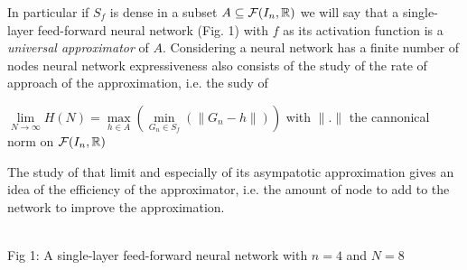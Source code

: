 \documentclass[12pt]{article}
\def\layersep{2.5cm}
\begin{document}
In particular if $S_f$ is dense in a subset $A \subseteq \mathcal{F}(I_n, \mathbb{R})$ we will say that a single-layer feed-forward neural network (Fig. 1) with $f$ as its activation function is a \textit{universal approximator} of $A$. Considering a neural network has a finite number of nodes neural network expressiveness also consists of the study of the rate of approach of the approximation, i.e. the sudy of \\

\begin{center}
  $\lim\limits_{N \to \infty} H(N) = \max\limits_{h\in A} (\min\limits_{G_n \in S_f} (\parallel G_n - h \parallel))$ with $\parallel . \parallel$ the cannonical norm on $\mathcal{F}(I_n, \mathbb{R})$
\end{center}

The study of that limit and especially of its asympatotic approximation gives an idea of the efficiency of the approximator, i.e. the amount of node to add to the network to improve the approximation.\\

\begin{center}
  \\
Fig 1: A single-layer feed-forward neural network with $n=4$ and $N=8$
\end{center}
\end{document}
